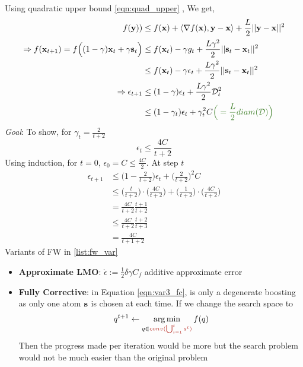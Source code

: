 \documentclass[summaries.tex]{subfiles}
\begin{document}
Using quadratic upper bound \ref{eqn:quad_upper} ,
We get,
\begin{align}
  f(\by)) &\leq f(\bx) + \langle \grad f(\bx), \by - \bx \rangle + \frac{L}{2}||\by - \bx||^2 \\
  \Rightarrow f(\bx_{t+1}) = f\Big((1 - \gamma)\bx_t + \gamma \bs_t\Big) & \leq f(\bx_t) - \gamma g_t + 
  \frac{L\gamma^2}{2}||\bs_t - \bx_t||^2 \nonumber\\
                                                                         &\leq f(\bx_t) - \gamma \epsilon_t 
                                                                         + \frac{L\gamma^2}{2}||\bs_t - \bx_t||^2 \nonumber\\
  \Rightarrow \epsilon_{t + 1} &\leq  (1 - \gamma) \epsilon_t 
  + \frac{L\gamma^2}{2}\data_t^2 \\
                               &\leq(1 - \gamma_t) \epsilon_t + \gamma_t^2 C 
                               \comm{\Big(= \frac{L}{2}diam(\data)\Big)}\\
\end{align}
\emph{Goal}: To show, for $\gamma_t = \frac{2}{t + 2}$
\begin{equation}
  \epsilon_t \leq \frac{4C}{t + 2}
\end{equation}
Using induction, for $t = 0$, $\epsilon_0 = C \leq \frac{4C}{2}$. At step $t$
\begin{align*}
  \epsilon_{t + 1} &\leq \Big(1 - \frac{2}{t + 2}\Big)\epsilon_t + \Big(\frac{2}{t + 2}\Big)^2 C \\
                   &\leq \Big(\frac{t}{t + 2}\Big) \cdot \Big(\frac{4C}{t + 2}\Big) 
                   + \Big(\frac{1}{t + 2}\Big) \cdot \Big(\frac{4C}{t + 2}\Big) \\
                   &= \frac{4C}{t + 2} \frac{t + 1}{t + 2} \\
                   &\leq \frac{4C}{t + 2} \frac{t + 2}{t + 3} \\
                   &= \frac{4C}{t + 1 + 2} 
\end{align*}
 \cite{jaggi2013revisiting}
\INPROGRESS
Variants of FW in \ref{list:fw_var}
\begin{itemize} \label{list:fw_var}
  \item {\bf Approximate LMO}: $\acute{\epsilon} := \frac{1}{2} \delta \gamma C_f$
    additive approximate error
  \item {\bf Fully Corrective}: in Equation \ref{eqn:var3_fc}, is only a degenerate
    boosting as only one atom $\mathbf{s}$ is chosen at each time. If we change the
    search space to
    $$
    q^{t + 1} \gets \argmin\limits_{q \in \red{conv(\bigcup_{i=1}^{t}{s^t})}}f(q)
    $$
    Then the progress made per iteration would be more but the search problem
    would not be much easier than the original problem
\end{itemize}
\end{document}
